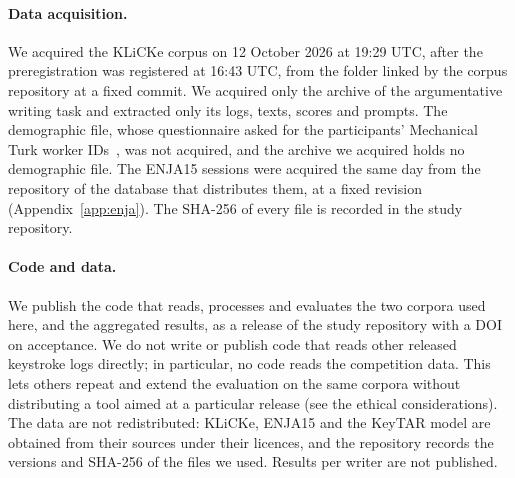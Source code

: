 \begin{openscience}
\paragraph{Data acquisition.}
We acquired the KLiCKe corpus on 12 October 2026 at 19:29 UTC, after the preregistration was registered at 16:43 UTC,
from the folder linked by the corpus repository at a fixed commit. We acquired only the archive of the argumentative
writing task and extracted only its logs, texts, scores and prompts. The demographic file, whose questionnaire asked
for the participants' Mechanical Turk worker IDs~\cite{tian2025klicke}, was not acquired, and the archive we acquired
holds no demographic file. The ENJA15 sessions were acquired the same day from the repository of the database that
distributes them, at a fixed revision (Appendix~\ref{app:enja}). The SHA-256 of every file is recorded in the study
repository.

\paragraph{Code and data.}
We publish the code that reads, processes and evaluates the two corpora used here, and the aggregated results, as a
release of the study repository with a DOI on acceptance. We do not write or publish code that reads other released
keystroke logs directly; in particular, no code reads the competition data. This lets others repeat and extend the
evaluation on the same corpora without distributing a tool aimed at a particular release (see the ethical
considerations). The data are not redistributed: KLiCKe, ENJA15 and the KeyTAR model are obtained from their sources
under their licences, and the repository records the versions and SHA-256 of the files we used. Results per writer are
not published.
\end{openscience}
